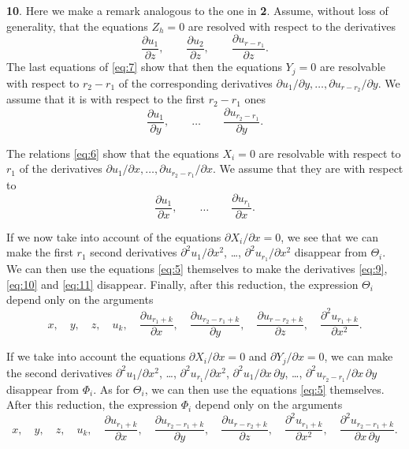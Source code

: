 \documentclass[leqno,11pt]{article}
\newcommand{\pd}{\partial}
\theoremstyle{shape1}
\theoremstyle{shape0}
\theoremstyle{shape2}
\theoremstyle{definition}
\begin{document}
\textbf{10}. Here we make a remark analogous to the one in \textsection\textbf{2}. Assume, without loss of generality, that the equations $Z_{h}=0$ are resolved with respect to the derivatives
\begin{equation}
  \label{eq:9}
  \frac{\pd u_{1}}{\pd z},\qquad\frac{\pd u_{2}}{\pd z},\qquad\frac{\pd u_{r-r_{1}}}{\pd z}.
\end{equation}
The last equations of \eqref{eq:7} show that then the equations $Y_{j}=0$ are resolvable with respect to $r_{2}-r_{1}$ of the corresponding derivatives $\pd u_{1}/\pd y,\dots,\pd u_{r-r_{2}}/\pd y$. We assume that it is with respect to the first $r_{2}-r_{1}$ ones
\begin{equation}
  \label{eq:10}
  \frac{\pd u_{1}}{\pd y},\qquad\dots\qquad\frac{\pd u_{r_{2}-r_{1}}}{\pd y}.
\end{equation}

The relations \eqref{eq:6} show that the equations $X_{i}=0$ are resolvable with respect to $r_{1}$ of the derivatives $\pd u_{1}/\pd x,\dots,\pd u_{r_{2}-r_{1}}/\pd x$. We assume that they are with respect to
\begin{equation}
  \label{eq:11}
  \frac{\pd u_{1}}{\pd x},\qquad\dots\qquad\frac{\pd u_{r_{1}}}{\pd x}.
\end{equation}

If we now take into account of the equations $\pd X_{i}/\pd x=0$, we see that we can make the first $r_{1}$ second derivatives $\pd^{2}u_{1}/\pd x^{2}$, \dots , $\pd^{2}u_{r_{1}}/\pd x^{2}$ disappear from $\Theta_{i}$. We can then use the equations \eqref{eq:5} themselves to make the derivatives \eqref{eq:9}, \eqref{eq:10} and \eqref{eq:11} disappear. Finally, after this reduction, the expression $\Theta_{i}$ depend only on the arguments
\[
x,\quad y,\quad z,\quad u_{k},\quad \frac{\pd u_{r_{1}+k}}{\pd x},\quad\frac{\pd u_{r_{2}-r_{1}+k}}{\pd y},\quad\frac{\pd u_{r-r_{2}+k}}{\pd z}, \quad\frac{\pd ^{2}u_{r_{1}+k}}{\pd x^{2}}.
\]

If we take into account the equations $\pd X_{i}/\pd x=0$ and $\pd Y_{j}/\pd x=0$, we can make the second derivatives $\pd^{2}u_{1}/\pd x^{2}$, \dots , $\pd^{2}u_{r_{1}}/\pd x^{2}$, $\pd^{2}u_{1}/\pd x\,\pd y$, \dots , $\pd^{2}u_{r_{2}-r_{1}}/\pd x\,\pd y$ disappear from $\Phi_{i}$. As for $\Theta_{i}$, we can then use the equations \eqref{eq:5} themselves. After this reduction, the expression $\Phi_{i}$ depend only on the arguments
\[
x,\quad y,\quad z,\quad u_{k},\quad \frac{\pd u_{r_{1}+k}}{\pd x},\quad\frac{\pd u_{r_{2}-r_{1}+k}}{\pd y},\quad\frac{\pd u_{r-r_{2}+k}}{\pd z}, \quad\frac{\pd ^{2}u_{r_{1}+k}}{\pd x^{2}},\quad\frac{\pd^{2}u_{r_{2}-r_{1}+k}}{\pd x\,\pd y}.
\]
\end{document}
